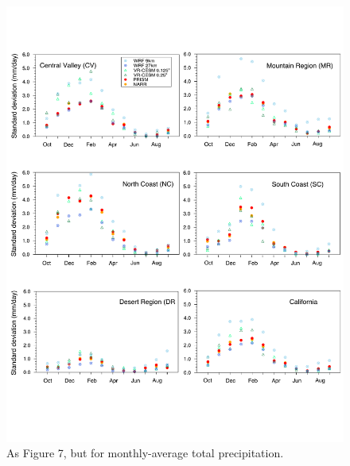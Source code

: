 \documentclass[draft,ms]{agutex}   %
\begin{document}
\begin{figure}
\begin{center}
\includegraphics[width=6in]{trd_pr_allzones_std.pdf}
\end{center}
\caption{As Figure 7, but for monthly-average total precipitation.} \label{fig:Figure 12}
\end{figure}
\end{document}
